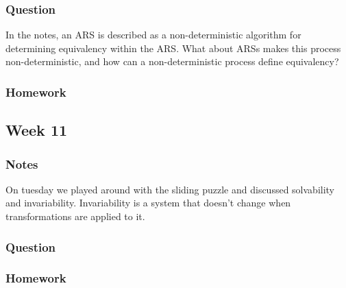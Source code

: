 \documentclass{article}
\theoremstyle{theorem}
\theoremstyle{definition}
\theoremstyle{remark}
\begin{document}
\subsubsection*{Question} In the notes, an ARS is described as a non-deterministic algorithm for determining equivalency within the ARS. What about ARSs makes this process non-deterministic, and how can a non-deterministic process define equivalency?

\subsubsection*{Homework}

\subsection{Week 11}

\subsubsection*{Notes} On tuesday we played around with the sliding puzzle and discussed solvability and invariability. Invariability is a system that doesn't change when transformations are applied to it.

\subsubsection*{Question} 

\subsubsection*{Homework}
\end{document}
